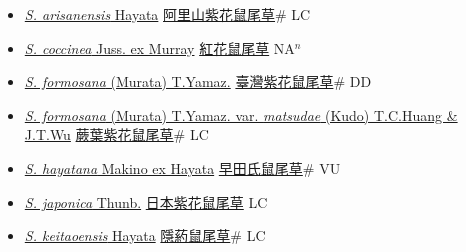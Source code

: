 \begin{itemize}
  \begin{itemize}
        \item[] \href{http://www.theplantlist.org/tpl1.1/search?q=Salvia+arisanensis}{\textit{S. arisanensis} Hayata}   \href{\detokenize{http://taibnet.sinica.edu.tw/chi/taibnet_species_list.php?T2=阿里山紫花鼠尾草&T2_new_value=true&fr=y}}{阿里山紫花鼠尾草}\# LC
        \item[] \href{http://www.theplantlist.org/tpl1.1/search?q=Salvia+coccinea}{\textit{S. coccinea} Juss. ex Murray}   \href{\detokenize{http://taibnet.sinica.edu.tw/chi/taibnet_species_list.php?T2=紅花鼠尾草&T2_new_value=true&fr=y}}{紅花鼠尾草} NA$^n$
        \item[] \href{http://www.theplantlist.org/tpl1.1/search?q=Salvia+formosana}{\textit{S. formosana} (Murata) T.Yamaz.}   \href{\detokenize{http://taibnet.sinica.edu.tw/chi/taibnet_species_list.php?T2=臺灣紫花鼠尾草&T2_new_value=true&fr=y}}{臺灣紫花鼠尾草}\# DD
        \item[] \href{http://www.theplantlist.org/tpl1.1/search?q=Salvia+formosana+var.+matsudae}{\textit{S. formosana} (Murata) T.Yamaz. var. \textit{matsudae} (Kudo) T.C.Huang \& J.T.Wu}   \href{\detokenize{http://taibnet.sinica.edu.tw/chi/taibnet_species_list.php?T2=蕨葉紫花鼠尾草&T2_new_value=true&fr=y}}{蕨葉紫花鼠尾草}\# LC
        \item[] \href{http://www.theplantlist.org/tpl1.1/search?q=Salvia+hayatana}{\textit{S. hayatana} Makino ex Hayata}   \href{\detokenize{http://taibnet.sinica.edu.tw/chi/taibnet_species_list.php?T2=早田氏鼠尾草&T2_new_value=true&fr=y}}{早田氏鼠尾草}\# VU
        \item[] \href{http://www.theplantlist.org/tpl1.1/search?q=Salvia+japonica}{\textit{S. japonica} Thunb.}   \href{\detokenize{http://taibnet.sinica.edu.tw/chi/taibnet_species_list.php?T2=日本紫花鼠尾草&T2_new_value=true&fr=y}}{日本紫花鼠尾草} LC
        \item[] \href{http://www.theplantlist.org/tpl1.1/search?q=Salvia+keitaoensis}{\textit{S. keitaoensis} Hayata}   \href{\detokenize{http://taibnet.sinica.edu.tw/chi/taibnet_species_list.php?T2=隱葯鼠尾草&T2_new_value=true&fr=y}}{隱葯鼠尾草}\# LC

\end{itemize}
\end{itemize}
